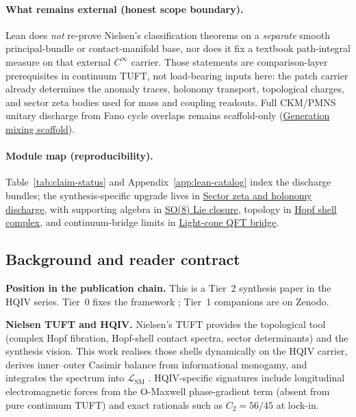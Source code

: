 \documentclass[11pt]{amsart}
\begin{document}
\paragraph{What remains external (honest scope boundary).}
Lean does \emph{not} re-prove Nielsen's classification theorems on a \emph{separate} smooth principal-bundle or contact-manifold base, nor does it fix a textbook path-integral measure on that external $C^\infty$ carrier. Those statements are comparison-layer prerequisites in continuum TUFT, not load-bearing inputs here: the patch carrier already determines the anomaly traces, holonomy transport, topological charges, and sector zeta bodies used for mass and coupling readouts. Full CKM/PMNS unitary discharge from Fano cycle overlaps remains scaffold-only (\hyperref[lean:t10-mixing-scaffold]{Generation mixing scaffold}).

\paragraph{Module map (reproducibility).}
Table~\ref{tab:claim-status} and Appendix~\ref{app:lean-catalog} index the discharge bundles; the synthesis-specific upgrade lives in \hyperref[lean:zeta-holonomy-discharge]{Sector zeta and holonomy discharge}, with supporting algebra in \hyperref[lean:so8-closure]{SO(8) Lie closure}, topology in \hyperref[lean:hopf-shell-complex]{Hopf shell complex}, and continuum-bridge limits in \hyperref[lean:lightcone-qft-bridge]{Light-cone QFT bridge}.

\subsection{Background and reader contract}
\label{sec:background}

\noindent\textbf{Position in the publication chain.}
This is a Tier~2 synthesis paper in the HQIV series. Tier~0 fixes the framework
\cite{ettinger2026hqiv,hqiv-lightcone-paper,hqiv-so8-paper}; Tier~1 companions
\cite{hqiv-3d-growth-paper,hqiv-oct-action-paper,hqiv-kirchhoff-paper,hqiv-thermo-arrow-paper}
are on Zenodo.

\noindent\textbf{Nielsen TUFT and HQIV.}
Nielsen's TUFT provides the topological tool (complex Hopf fibration, Hopf-shell contact spectra, sector determinants) and the synthesis vision. This work realises those shells dynamically on the HQIV carrier, derives inner--outer Casimir balance from informational monogamy, and integrates the spectrum into $\mathcal{L}_{\mathrm{SM}}$ \cite{glashow1961,weinberg1967,salam1968,yang1954}. HQIV-specific signatures include longitudinal electromagnetic forces from the O-Maxwell phase-gradient term (absent from pure continuum TUFT) and exact rationals such as $C_2=56/45$ at lock-in.
\end{document}
